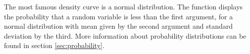 \begin{center}
\begin{knitrout}
\end{knitrout}

\end{center}

The most famous density curve is a normal distribution.  The  function
displays the probability that a random variable is less than the first argument, for a 
normal distribution with mean given by the second argument and standard deviation by the 
third.  More information about probability distributions can 
be found in section \ref{sec:probability}.

